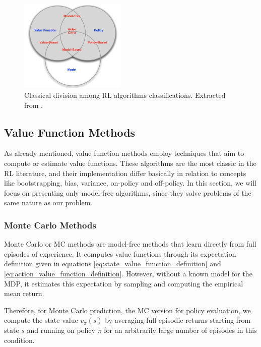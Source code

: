 

\begin{figure}[H]
    \centering
    \includegraphics[width=0.45\textwidth]{Chapter2/categorizing_RL.png} 
    \caption{Classical division among RL algorithms classifications. Extracted from \cite{lecture1DS}.}
    \label{fig:categorizing_RL}
\end{figure}

\subsection{Value Function Methods}

As already mentioned, value function methods employ techniques that aim to compute or estimate value functions. These algorithms are the most classic in the RL literature, and their implementation differ basically in relation to concepts like bootstrapping, bias, variance, on-policy and off-policy. In this section, we will focus on presenting only model-free algorithms, since they solve problems of the same nature as our problem.

\subsubsection{Monte Carlo Methods}

Monte Carlo or MC methods \cite{Sutton1998} are model-free methods that learn directly from full episodes of experience. It computes value functions through its expectation definition given in equations \eqref{eq:state_value_function_definition} and \eqref{eq:action_value_function_definition}. However, without a known model for the MDP, it estimates this expectation by sampling and computing the empirical mean return.

Therefore, for Monte Carlo prediction, the MC version for policy evaluation, we compute the state value $v_{\pi}(s)$ by averaging full episodic returns starting from state $s$ and running on policy $\pi$ for an arbitrarily large number of episodes in this condition.


